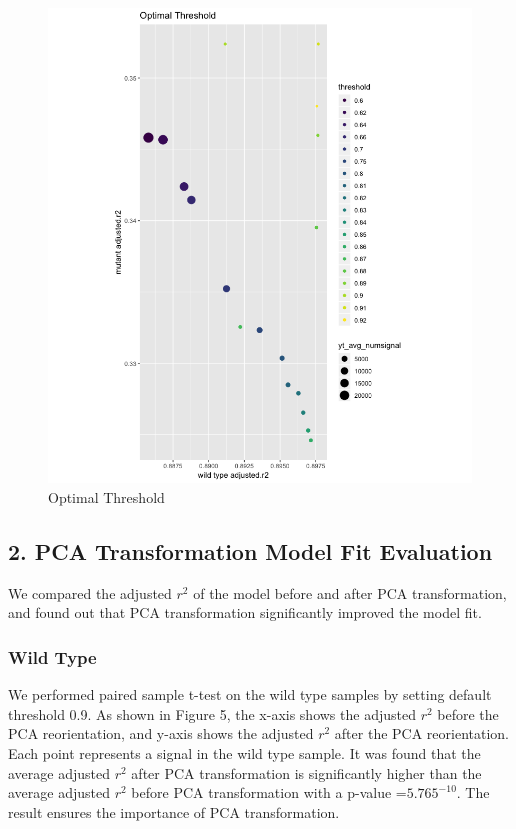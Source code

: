 \documentclass[10pt,letterpaper]{article}
\begin{document}
\begin{figure}
\includegraphics[width=1\linewidth]{visualization_paper/optimal_threshold} \caption{Optimal Threshold}\label{fig:Figure4}
\end{figure}

\hypertarget{pca-transformation-model-fit-evaluation}{%
\subsection{2. PCA Transformation Model Fit
Evaluation}\label{pca-transformation-model-fit-evaluation}}

We compared the adjusted \(r^2\) of the model before and after PCA
transformation, and found out that PCA transformation significantly
improved the model fit.

\hypertarget{wild-type-1}{%
\subsubsection{Wild Type}\label{wild-type-1}}

We performed paired sample t-test on the wild type samples by setting
default threshold 0.9. As shown in Figure 5, the x-axis shows the
adjusted \(r^2\) before the PCA reorientation, and y-axis shows the
adjusted \(r^2\) after the PCA reorientation. Each point represents a
signal in the wild type sample. It was found that the average adjusted
\(r^2\) after PCA transformation is significantly higher than the
average adjusted \(r^2\) before PCA transformation with a p-value
=\(5.765^{-10}\). The result ensures the importance of PCA
transformation.\\
\end{document}
